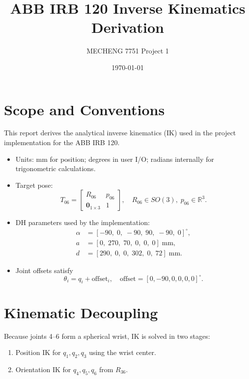 \documentclass[11pt]{article}
\title{ABB IRB 120 Inverse Kinematics Derivation}
\author{MECHENG 7751 Project 1}
\date{\today}
\begin{document}
\maketitle

\section{Scope and Conventions}
This report derives the analytical inverse kinematics (IK) used in the project implementation for the ABB IRB 120.

\begin{itemize}[leftmargin=1.5em]
    \item Units: mm for position; degrees in user I/O; radians internally for trigonometric calculations.
    \item Target pose:
    \begin{equation}
        T_{06}=\begin{bmatrix}R_{06} & p_{06}\\ \mathbf{0}_{1\times3} & 1\end{bmatrix},
        \quad R_{06}\in SO(3),\; p_{06}\in\mathbb{R}^{3}.
    \end{equation}
    \item DH parameters used by the implementation:
    \begin{align*}
        \alpha &= [-90,\;0,\;-90,\;90,\;-90,\;0]^\circ,\\
        a &= [0,\;270,\;70,\;0,\;0,\;0]\;\text{mm},\\
        d &= [290,\;0,\;0,\;302,\;0,\;72]\;\text{mm}.
    \end{align*}
    \item Joint offsets satisfy
    \begin{equation}
        \theta_i = q_i + \mathrm{offset}_i,
        \quad \mathrm{offset}=[0,-90,0,0,0,0]^\circ.
    \end{equation}
\end{itemize}

\section{Kinematic Decoupling}
Because joints 4--6 form a spherical wrist, IK is solved in two stages:
\begin{enumerate}[leftmargin=1.5em]
    \item Position IK for $q_1,q_2,q_3$ using the wrist center.
    \item Orientation IK for $q_4,q_5,q_6$ from $R_{36}$.
\end{enumerate}
\end{document}
